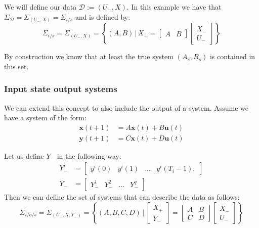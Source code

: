 We will define our data $\mathcal{D} := (U_-, X)$. In this example we have that $\Sigma_\mathcal{D} = \Sigma_{(U_-,X)} = \Sigma_{i/s}$ and is defined by:
\begin{equation} \label{isSet}
	\Sigma_{i/s} = \Sigma_{(U_-,X)} = \left\{ (A, B) \, | \, X_{+} = \begin{bmatrix} A & B \end{bmatrix} \begin{bmatrix} X_{-} \\ U_{-} \end{bmatrix} \right\}
\end{equation}

By construction we know that at least the true system $(A_s,B_s)$ is contained in this set.


\subsubsection*{Input state output systems}
We can extend this concept to also include the output of a system. Assume we have a system of the form:
\begin{subequations}\label{isoSystem}
	\begin{align}
		\mathbf{x}(t+1) &= A \mathbf{x}(t) + B \mathbf{u}(t) \\
		\mathbf{y}(t+1) &= C \mathbf{x}(t) + D \mathbf{u}(t)
	\end{align}
\end{subequations}

Let us define $Y_-$ in the following way:
\begin{align*}
	Y_-^i &= \begin{bmatrix}	y^i(0) & y^i(1)& \dots & y^i(T_i-1); \end{bmatrix}\\
	Y_- &= \begin{bmatrix} Y_-^1 & Y_-^2 & \dots & Y_-^q	\end{bmatrix}
\end{align*}
Then we can define the set of systems that can describe the data as follows:
\begin{equation}
\label{isoSet} 
\Sigma_{i/o/s} = 
\Sigma_{(U_-,X, Y_-)} = \left\{ (A, B, C, D) \, | \, 
\begin{bmatrix} X_{+} \\ Y_{-} \end{bmatrix} = 
\begin{bmatrix} A & B \\ C & D \end{bmatrix} 
\begin{bmatrix} X_{-} \\ U_{-} \end{bmatrix} \right\} 
\end{equation}


